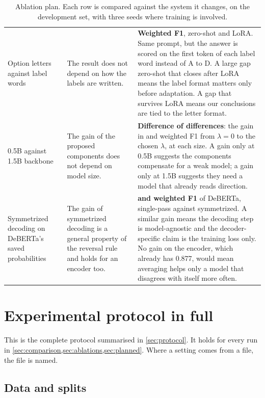 \begin{table}[H]
\begin{tabular}{@{}N{0.15\textwidth}L{0.24\textwidth}L{0.55\textwidth}@{}}
\addlinespace
Option letters against label words &
The result does not depend on how the labels are written. &
\textbf{Weighted F1}, zero-shot and LoRA. Same prompt, but the answer is scored on the first token of each label word instead of A to D. A large gap zero-shot that closes after LoRA means the label format matters only before adaptation. A gap that survives LoRA means our conclusions are tied to the letter format. \\
\addlinespace
0.5B against 1.5B backbone &
The gain of the proposed components does not depend on model size. &
\textbf{Difference of differences}: the gain in \HardCons{} and weighted F1 from $\lambda = 0$ to the chosen $\lambda$, at each size. A gain only at 0.5B suggests the components compensate for a weak model; a gain only at 1.5B suggests they need a model that already reads direction. \\
\addlinespace
Symmetrized decoding on DeBERTa's saved probabilities &
The gain of symmetrized decoding is a general property of the reversal rule and holds for an encoder too. &
\textbf{\HardCons{} and weighted F1} of DeBERTa, single-pass against symmetrized. A similar gain means the decoding step is model-agnostic and the decoder-specific claim is the training loss only. No gain on the encoder, which already has \SoftCons{} 0.877, would mean averaging helps only a model that disagrees with itself more often. \\
\bottomrule
\end{tabular}
\caption{Ablation plan. Each row is compared against the system it changes, on the development set, with three seeds where training is involved.}
\label{tab:ablations}
\end{table}


\section{Experimental protocol in full}
\label{app:protocol}

This is the complete protocol summarised in \cref{sec:protocol}. It holds for every run in \cref{sec:comparison,sec:ablations,sec:planned}. Where a setting comes from a file, the file is named.

\subsection{Data and splits}
\label{sec:protocol-data}

